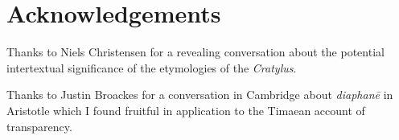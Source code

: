 \chapter*{Acknowledgements} %
\label{cha:acknowledgements}

Thanks to Niels Christensen for a revealing conversation about the potential intertextual significance of the etymologies of the \emph{Cratylus}.

Thanks to Justin Broackes for a conversation in Cambridge about \emph{diaphanē} in Aristotle which I found fruitful in application to the Timaean account of transparency.

